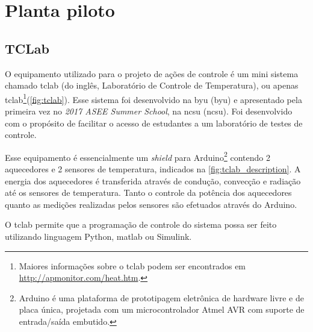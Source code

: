 
\chapter{Planta piloto}
\label{ch:planta_piloto}

\section{TCLab}
\label{sec:tclab}

O equipamento utilizado para o projeto de ações de controle é um mini sistema chamado \acrlong{tclab}
(do inglês, Laboratório de Controle de Temperatura), ou apenas \acrshort{tclab}\footnote{                       %
	Maiores informações sobre o \acrshort{tclab} podem ser encontrados em
	\href{http://apmonitor.com/heat.htm}{http://apmonitor.com/heat.htm}.
}(\cref{fig:tclab}). Esse sistema foi desenvolvido na \acrlong{byu} (\acrshort{byu}) e apresentado
pela primeira vez no \textit{2017 ASEE Summer School}, na \acrlong{ncsu} (\acrshort{ncsu}). Foi
desenvolvido com o propósito de facilitar o acesso de estudantes a um laboratório de testes de controle.

Esse equipamento é essencialmente um \textit{shield} para Arduino\footnote{
    Arduino é uma plataforma de prototipagem eletrônica de hardware livre e de placa única, projetada com um    %
    microcontrolador Atmel AVR com suporte de entrada/saída embutido.                                           %
} contendo 2 aquecedores e 2 sensores de temperatura, indicados na \cref{fig:tclab_description}. A energia dos aquecedores é
transferida através de condução, convecção e radiação até os sensores de temperatura. Tanto o controle da
potência dos aquecedores quanto as medições realizadas pelos sensores são efetuados através do Arduino.

O \acrshort{tclab} permite que a programação de controle do sistema possa ser feito utilizando linguagem Python,
\acrshort{matlab} ou Simulink.

